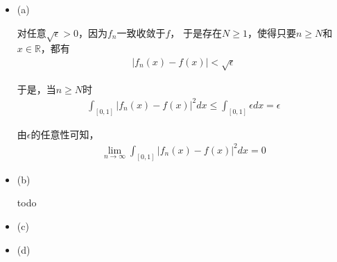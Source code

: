 \documentclass{article}
\begin{document}
\begin{itemize}
  \item (a)

        对任意$\sqrt{\epsilon} > 0$，因为$f_n$一致收敛于$f$，
        于是存在$N \geq 1$，使得只要$n \geq N$和$x \in \mathbb{R}$，都有
        \begin{align*}
          |f_n(x) - f(x)| < \sqrt{\epsilon}
        \end{align*}

        于是，当$n \geq N$时
        \begin{align*}
          \int_{[0, 1]} |f_n(x) - f(x)|^2 dx \leq \int_{[0, 1]} \epsilon dx = \epsilon
        \end{align*}

        由$\epsilon$的任意性可知，
        \begin{align*}
          \lim\limits_{n \to \infty} \int_{[0, 1]} |f_n(x) - f(x)|^2 dx = 0
        \end{align*}

  \item (b)

        todo

  \item (c)

  \item (d)

\end{itemize}
\end{document}
